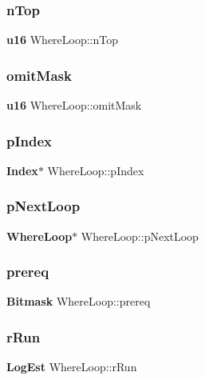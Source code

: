 \subsubsection{nTop}
{\footnotesize\ttfamily \textbf{ u16} Where\+Loop\+::n\+Top}

\mbox{\label{struct_where_loop_af67ad30433e111e3b1380bb422b8b7cd}} 
\subsubsection{omitMask}
{\footnotesize\ttfamily \textbf{ u16} Where\+Loop\+::omit\+Mask}

\mbox{\label{struct_where_loop_a0221cfe6443b10f9b09d719296b44060}} 
\subsubsection{pIndex}
{\footnotesize\ttfamily \textbf{ Index}$\ast$ Where\+Loop\+::p\+Index}

\mbox{\label{struct_where_loop_a568852114be14c3a23cef6f8a1c98f4f}} 
\subsubsection{pNextLoop}
{\footnotesize\ttfamily \textbf{ Where\+Loop}$\ast$ Where\+Loop\+::p\+Next\+Loop}

\mbox{\label{struct_where_loop_aa654af6ecff71bd43c4b0cd6046ccf4d}} 
\subsubsection{prereq}
{\footnotesize\ttfamily \textbf{ Bitmask} Where\+Loop\+::prereq}

\mbox{\label{struct_where_loop_a1a67183b699c90c23940f540486b07d6}} 
\subsubsection{rRun}
{\footnotesize\ttfamily \textbf{ Log\+Est} Where\+Loop\+::r\+Run}

\mbox{\label{struct_where_loop_a5e28f2d1299993056255158d33baea33}} 
